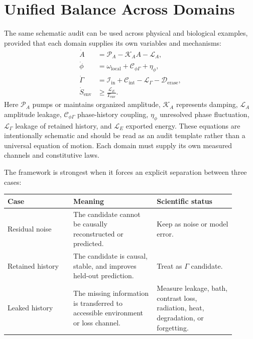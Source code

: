 \documentclass[11pt,a4paper]{article}
\newcommand{\Ghist}{\Gamma}
\begin{document}
\section{Unified Balance Across Domains}
The same schematic audit can be used across physical and biological examples, provided that each domain supplies its own variables and mechanisms:
\begin{align}
  \dot A
  &= \mathcal{P}_A - \mathcal{K}_A A - \mathcal{L}_A,
  \label{eq:amp-balance}\\
  \dot\phi
  &= \omega_{\mathrm{local}} + \mathcal{C}_{\phi\Ghist} + \eta_\phi,
  \label{eq:phase-balance}\\
  \dot\Ghist
  &= \mathcal{I}_{\mathrm{in}} + \mathcal{C}_{\mathrm{int}} - \mathcal{L}_{\Ghist} - \mathcal{D}_{\mathrm{erase}},
  \label{eq:history-balance}\\
  \dot S_{\mathrm{env}}
  &\geq \frac{\mathcal{L}_{E}}{T_{\mathrm{env}}}.
  \label{eq:entropy-balance}
\end{align}
Here \(\mathcal{P}_A\) pumps or maintains organized amplitude, \(\mathcal{K}_A\) represents damping, \(\mathcal{L}_A\) amplitude leakage, \(\mathcal{C}_{\phi\Ghist}\) phase-history coupling, \(\eta_\phi\) unresolved phase fluctuation, \(\mathcal{L}_{\Ghist}\) leakage of retained history, and \(\mathcal{L}_E\) exported energy.  These equations are intentionally schematic and should be read as an audit template rather than a universal equation of motion.  Each domain must supply its own measured channels and constitutive laws.

The framework is strongest when it forces an explicit separation between three cases:
\begin{center}
\small
\begin{tabular}{L{0.26\linewidth}L{0.33\linewidth}L{0.31\linewidth}}
\toprule
Case & Meaning & Scientific status \\
\midrule
Residual noise & The candidate cannot be causally reconstructed or predicted. & Keep as noise or model error. \\
Retained history & The candidate is causal, stable, and improves held-out prediction. & Treat as \(\Ghist\) candidate. \\
Leaked history & The missing information is transferred to accessible environment or loss channel. & Measure leakage, bath, contrast loss, radiation, heat, degradation, or forgetting. \\
\bottomrule
\end{tabular}
\end{center}
\end{document}

